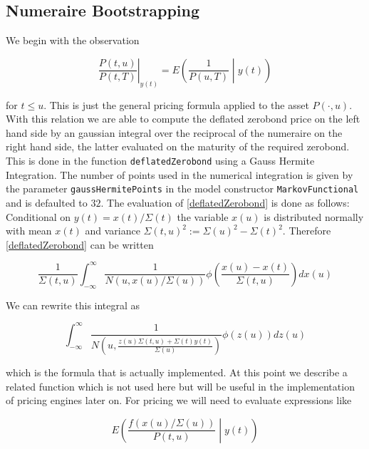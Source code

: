 \documentclass{amsart}
\theoremstyle{plain}
\numberwithin{equation}{section}
\begin{document}
\subsection{Numeraire Bootstrapping}

We begin with the observation

\begin{equation}\label{deflatedZerobond}
\left.\frac{P(t,u)}{P(t,T)}\right|_{y(t)}  = E\left(\frac{1}{P(u,T)} \middle| y(t) \right)
\end{equation}

for $t\leq u$. This is just the general pricing formula applied to the asset $P(\cdot,u)$. With this relation we are able to compute the deflated zerobond price on the left hand side by an gaussian integral over the reciprocal of the numeraire on the right hand side, the latter evaluated on the maturity of the required zerobond. This is done in the function \verb+deflatedZerobond+ using a Gauss Hermite Integration. The number of points used in the numerical integration is
given by the parameter \verb+gaussHermitePoints+ in the model constructor \verb+MarkovFunctional+ and is defaulted to $32$. The evaluation of \ref{deflatedZerobond} is done as follows: Conditional on $y(t) = x(t) / \Sigma(t)$ the variable $x(u)$ is distributed normally with mean $x(t)$ and variance $\Sigma(t,u)^2 := \Sigma(u)^2-\Sigma(t)^2$. Therefore \ref{deflatedZerobond} can be written

\begin{equation}\label{deflatedZerobondIntegral}
\frac{1}{\Sigma(t,u)} \int_{-\infty}^{\infty} \frac{1}{N(u,x(u)/\Sigma(u))} \phi\left( \frac{x(u) - x(t)}{\Sigma(t,u)}\right) dx(u)
\end{equation}

We can rewrite this integral as

\begin{equation}
\int_{-\infty}^{\infty} \frac{1}{N \left(u, \frac{z(u)\Sigma(t,u)+\Sigma(t)y(t)}{\Sigma(u)} \right)}\phi(z(u)) dz(u)
\end{equation}

which is the formula that is actually implemented. At this point we describe a related function which is not used here but will be useful in the implementation of pricing engines later on. For pricing we will need to evaluate expressions like

\begin{equation}\label{pricingformula}
E\left( \frac{f(x(u)/\Sigma(u))}{P(t,u)} \middle| y(t) \right)
\end{equation}
\end{document}
